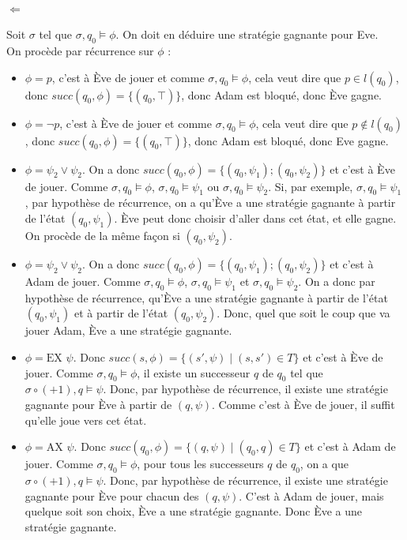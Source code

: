 \documentclass[10pt,a4paper]{article}
\begin{document}
\paragraph{$\Longleftarrow$}
Soit $\sigma$ tel que $\sigma,q_0 \vDash \phi$. On doit en déduire une stratégie gagnante pour Eve.\\
On procède par récurrence sur $\phi$ :
\begin{itemize}
\item $\phi = p$, c'est à Ève de jouer et comme $\sigma,q_0 \vDash \phi$, cela veut dire que $p \in l(q_0)$, donc $succ(q_0,\phi) = \{(q_0, \top)\}$, donc Adam est bloqué, donc Ève gagne.
\item $\phi = \neg p$, c'est à Ève de jouer et comme $\sigma,q_0 \vDash \phi$, cela veut dire que $p \notin l(q_0)$, donc $succ(q_0,\phi) = \{(q_0, \top)\}$, donc Adam est bloqué, donc Eve gagne.

\item $\phi = \psi_2 \lor \psi_2$. On a donc $succ(q_0,\phi) = \{(q_0, \psi_1); (q_0, \psi_2) \}$ et c'est à Ève de jouer. Comme $\sigma,q_0 \vDash \phi$, $\sigma,q_0 \vDash \psi_1$ ou $\sigma,q_0 \vDash \psi_2$. Si, par exemple, $\sigma,q_0 \vDash \psi_1$, par hypothèse de récurrence, on a qu'Ève a une stratégie gagnante à partir de l'état $(q_0, \psi_1)$. Ève peut donc choisir d'aller dans cet état, et elle gagne. On procède de la même façon si $(q_0, \psi_2)$.

\item $\phi = \psi_2 \lor \psi_2$. On a donc $succ(q_0,\phi) = \{(q_0, \psi_1); (q_0, \psi_2) \}$ et c'est à Adam de jouer. Comme $\sigma,q_0 \vDash \phi$, $\sigma,q_0 \vDash \psi_1$ et $\sigma,q_0 \vDash \psi_2$. On a donc par hypothèse de récurrence, qu'Ève a une stratégie gagnante à partir de l'état $(q_0, \psi_1)$ et à partir de l'état $(q_0, \psi_2)$. Donc, quel que soit le coup que va jouer Adam, Ève a une stratégie gagnante.

\item $\phi = \mbox{EX } \psi$. Donc $succ(s, \phi) = \{ (s', \psi) \mid (s,s') \in T \} $ et c'est à Ève de jouer. Comme $\sigma,q_0 \vDash \phi$, il existe un successeur $q$ de $q_0$ tel que $\sigma\circ (+ 1),q \vDash \psi$. Donc, par hypothèse de récurrence, il existe une stratégie gagnante pour Ève à partir de $(q, \psi)$. Comme c'est à Ève de jouer, il suffit qu'elle joue vers cet état.

\item $\phi = \mbox{AX } \psi$. Donc $succ(q_0, \phi) = \{ (q, \psi) \mid (q_0,q) \in T \} $ et c'est à Adam de jouer. Comme $\sigma,q_0 \vDash \phi$, pour tous les successeurs $q$ de $q_0$, on a que $\sigma\circ (+ 1),q \vDash \psi$. Donc, par hypothèse de récurrence, il existe une stratégie gagnante pour Ève pour chacun des $(q, \psi)$. C'est à Adam de jouer, mais quelque soit son choix, Ève a une stratégie gagnante. Donc Ève a une stratégie gagnante.


\end{itemize}
\end{document}
